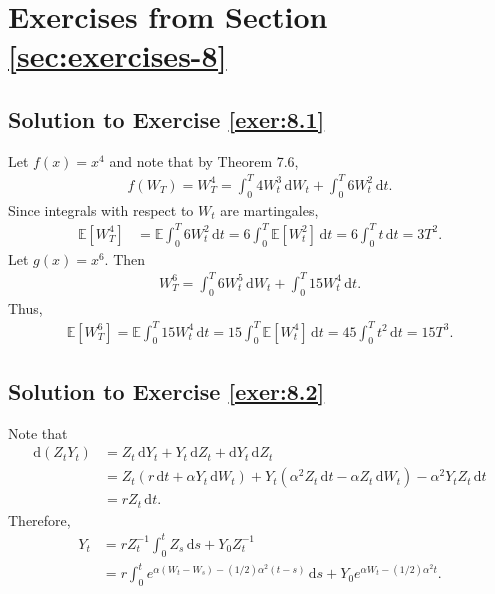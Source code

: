 \documentclass[12pt]{book}
\numberwithin{equation}{chapter}
\theoremstyle{plain}
\numberwithin{theorem}{section}
\theoremstyle{definition}
\numberwithin{exercise}{chapter}
\newcommand{\<}{\langle}
\renewcommand{\>}{\rangle}
\renewcommand{\(}{\left(}
\renewcommand{\)}{\right)}
\renewcommand{\[}{\left[}
\renewcommand{\]}{\right]}
\newcommand\Eb{\mathds{E}}
\newcommand\dd{\mathrm{d}}
\begin{document}

\section{Exercises from Section \ref{sec:exercises-8}}

\subsection*{Solution to Exercise \ref{exer:8.1}}
Let $f(x) = x^4$ and note that by Theorem 7.6,
\begin{align}
f(W_T) 
	= W_T^4
	= \int_0^T 4 W_t^3\, \dd W_t + \int_0^T 6 W_t^2\, \dd t.
\end{align}
Since integrals with respect to $W_t$ are martingales, 
\begin{align}
\Eb[ W_T^4]
	&= \Eb \int_0^T 6 W_t^2\, \dd t
	= 6 \int_0^T \Eb[ W_t^2]\, \dd t 
	= 6 \int_0^T t\, \dd t
	= 3 T^2.
\end{align}
Let $g(x) = x^6$. Then 
\begin{align}
W_T^6 
	= \int_0^T 6 W_t^5\, \dd W_t + \int_0^T 15 W_t^4\, \dd t.
\end{align}
Thus, 
\begin{align}
\Eb[ W_T^6]
	= \Eb \int_0^T 15 W_t^4\, \dd t
	= 15 \int_0^T \Eb [W_t^4]\, \dd t 
	= 45 \int_0^T t^2\, \dd t  
	= 15 T^3.
\end{align}

\subsection*{Solution to Exercise \ref{exer:8.2}}
Note that 
\begin{align}
\dd (Z_t Y_t)
	&= Z_t\, \dd Y_t + Y_t\, \dd Z_t + \dd Y_t\, \dd Z_t \\
	&= Z_t \( r\, \dd t + \alpha Y_t\, \dd W_t\) + Y_t \( \alpha^2 Z_t\, \dd t - \alpha Z_t\, \dd W_t\) 
		- \alpha^2 Y_t Z_t\, \dd t \\
	&= r Z_t\, \dd t.
\end{align}
Therefore, 
\begin{align}
Y_t 
	&= r Z_t^{-1}\int_0^t Z_s\, \dd s + Y_0 Z_t^{-1} \\
	&= r \int_0^t e^{ \alpha( W_t - W_s) -(1/2)\alpha^2(t-s)}\, \dd s 
		+ Y_0 e^{\alpha W_t - (1/2) \alpha^2 t}.
\end{align}
\end{document}
